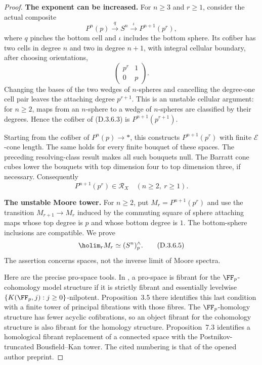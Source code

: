 \begin{proof}
\medskip\noindent
\textbf{The exponent can be increased.}
For $n\geq3$ and $r\geq1$, consider the actual composite
\[
 P^n(p)\xrightarrow{q}S^n
       \xrightarrow{\iota}P^{n+1}(p^r),
 \tag{D.3.6.3}
\]
where $q$ pinches the bottom cell and $\iota$ includes the
bottom sphere. Its cofiber has two cells in degree $n$ and
two in degree $n+1$, with integral cellular boundary, after
choosing orientations,
\[
                    \begin{pmatrix}p^r&1\\0&p\end{pmatrix}.
\]
Changing the bases of the two wedges of $n$-spheres and
cancelling the degree-one cell pair leaves the attaching
degree $p^{r+1}$. This is an unstable cellular argument:
for $n\geq2$, maps from an $n$-sphere to a wedge of
$n$-spheres are classified by their degrees. Hence the
cofiber of (D.3.6.3) is $P^{n+1}(p^{r+1})$.

Starting from the cofiber of $P^n(p)\to *$, this constructs
$P^{n+1}(p^r)$ with finite $\mathcal E$-cone length.
The same holds for every finite bouquet of these spaces.
The preceding resolving-class result makes all such bouquets
null. The Barratt cone cubes lower the bouquets with top
dimension four to top dimension three, if necessary.
Consequently
\[
               P^{n+1}(p^r)\in\mathcal R_X
                         \quad(n\geq2,\ r\geq1).
 \tag{D.3.6.4}
\]

\medskip\noindent
\textbf{The unstable Moore tower.}
For $n\geq2$, put $M_r=P^{n+1}(p^r)$ and use the transition
$M_{r+1}\to M_r$ induced by the commuting square of sphere
attaching maps whose top degree is $p$ and whose bottom
degree is $1$. The bottom-sphere inclusions are compatible.
We prove
\[
                   \holim_r M_r\simeq(S^n)^{\wedge}_p.
 \tag{D.3.6.5}
\]
The assertion concerns spaces, not the inverse limit of
Moore spectra.

Here are the precise pro-space tools. In
\cite[Theorems~3.3, 6.3, 6.7 and~7.2; Proposition~7.3]
{I_Isaksen2005}, a pro-space is fibrant for the
$\FF_p$-cohomology model structure if it is strictly fibrant
and essentially levelwise
$\{K(\FF_p,j):j\geq0\}$-nilpotent. Proposition~3.5 there
identifies this last condition with a finite tower of
principal fibrations with those fibres. The
$\FF_p$-homology structure has fewer acyclic cofibrations,
so an object fibrant for the cohomology structure is
also fibrant for the homology structure. Proposition~7.3
identifies a homological fibrant replacement of a connected
space with the Postnikov-truncated Bousfield--Kan tower.
The cited numbering is that of the opened author preprint.


\end{proof}
